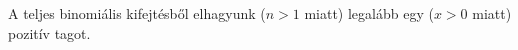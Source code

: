    A teljes binomiális kifejtésből elhagyunk ($n>1$ miatt) legalább egy ($x>0$ miatt) 
   pozitív tagot.
